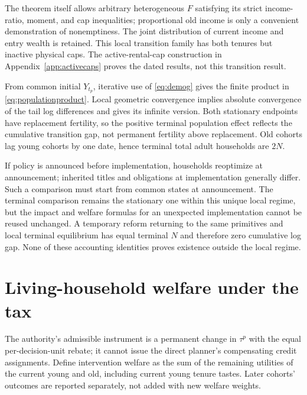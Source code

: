 \documentclass[11pt]{article}
\begin{document}
The theorem itself allows arbitrary heterogeneous $F$ satisfying its strict income-ratio, moment, and cap inequalities; proportional old income is only a convenient demonstration of nonemptiness. The joint distribution of current income and entry wealth is retained. This local transition family has both tenures but inactive physical caps. The active-rental-cap construction in Appendix~\ref{app:activecaps} proves the dated results, not this transition result.

From common initial $Y_{t_p}$, iterative use of \eqref{eq:demog} gives the finite product in \eqref{eq:populationproduct}. Local geometric convergence implies absolute convergence of the tail log differences and gives its infinite version. Both stationary endpoints have replacement fertility, so the positive terminal population effect reflects the cumulative transition gap, not permanent fertility above replacement. Old cohorts lag young cohorts by one date, hence terminal total adult households are $2N$.

If policy is announced before implementation, households reoptimize at announcement; inherited titles and obligations at implementation generally differ. Such a comparison must start from common states at announcement. The terminal comparison remains the stationary one within this unique local regime, but the impact and welfare formulas for an unexpected implementation cannot be reused unchanged. A temporary reform returning to the same primitives and local terminal equilibrium has equal terminal $N$ and therefore zero cumulative log gap. None of these accounting identities proves existence outside the local regime.

\section{Living-household welfare under the tax}\label{app:welfare}
The authority's admissible instrument is a permanent change in $\tau^p$ with the equal per-decision-unit rebate; it cannot issue the direct planner's compensating credit assignments. Define intervention welfare as the sum of the remaining utilities of the current young and old, including current young tenure tastes. Later cohorts' outcomes are reported separately, not added with new welfare weights.
\end{document}
